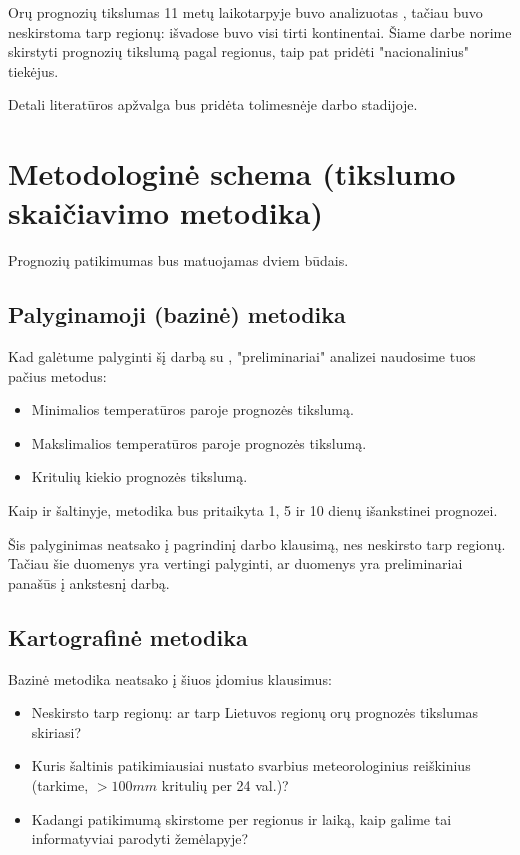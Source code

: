 \documentclass{article}
\begin{document}
Orų prognozių tikslumas 11 metų laikotarpyje buvo analizuotas
\cite{rose2017analysis}, tačiau buvo neskirstoma tarp regionų: išvadose buvo
visi tirti kontinentai. Šiame darbe norime skirstyti prognozių tikslumą pagal
regionus, taip pat pridėti "nacionalinius" tiekėjus.

Detali literatūros apžvalga bus pridėta tolimesnėje darbo stadijoje.

\section{Metodologinė schema (tikslumo skaičiavimo metodika)}

Prognozių patikimumas bus matuojamas dviem būdais.

\subsection{Palyginamoji (bazinė) metodika}

Kad galėtume palyginti šį darbą su \cite{rose2017analysis}, "preliminariai"
analizei naudosime tuos pačius metodus:

\begin{itemize}
    \item Minimalios temperatūros paroje prognozės tikslumą.
    \item Makslimalios temperatūros paroje prognozės tikslumą.
    \item Kritulių kiekio prognozės tikslumą.
\end{itemize}

Kaip ir šaltinyje, metodika bus pritaikyta 1, 5 ir 10 dienų išankstinei
prognozei.

Šis palyginimas neatsako į pagrindinį darbo klausimą, nes neskirsto tarp
regionų. Tačiau šie duomenys yra vertingi palyginti, ar duomenys yra preliminariai
panašūs į ankstesnį darbą.

\subsection{Kartografinė metodika}

Bazinė metodika neatsako į šiuos įdomius klausimus:

\begin{itemize}
    \item Neskirsto tarp regionų: ar tarp Lietuvos regionų orų prognozės
        tikslumas skiriasi?
    \item Kuris šaltinis patikimiausiai nustato svarbius meteorologinius
        reiškinius (tarkime, $>100mm$ kritulių per 24 val.)?
    \item Kadangi patikimumą skirstome per regionus ir laiką, kaip galime tai
        informatyviai parodyti žemėlapyje?
\end{itemize}
\end{document}
